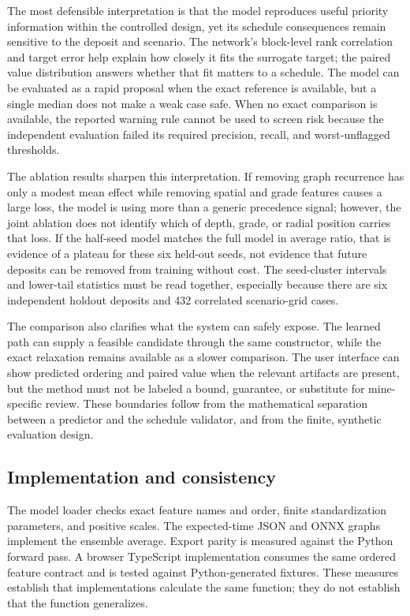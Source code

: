 \documentclass[11pt]{article}
\begin{document}
The most defensible interpretation is that the model reproduces useful priority information within the controlled design, yet its schedule consequences remain sensitive to the deposit and scenario. The network's block-level rank correlation and target error help explain how closely it fits the surrogate target; the paired value distribution answers whether that fit matters to a schedule. The model can be evaluated as a rapid proposal when the exact reference is available, but a single median does not make a weak case safe. When no exact comparison is available, the reported warning rule cannot be used to screen risk because the independent evaluation failed its required precision, recall, and worst-unflagged thresholds.

The ablation results sharpen this interpretation. If removing graph recurrence has only a modest mean effect while removing spatial and grade features causes a large loss, the model is using more than a generic precedence signal; however, the joint ablation does not identify which of depth, grade, or radial position carries that loss. If the half-seed model matches the full model in average ratio, that is evidence of a plateau for these six held-out seeds, not evidence that future deposits can be removed from training without cost. The seed-cluster intervals and lower-tail statistics must be read together, especially because there are six independent holdout deposits and 432 correlated scenario-grid cases.

The comparison also clarifies what the system can safely expose. The learned path can supply a feasible candidate through the same constructor, while the exact relaxation remains available as a slower comparison. The user interface can show predicted ordering and paired value when the relevant artifacts are present, but the method must not be labeled a bound, guarantee, or substitute for mine-specific review. These boundaries follow from the mathematical separation between a predictor and the schedule validator, and from the finite, synthetic evaluation design.

\subsection{Implementation and consistency}
The model loader checks exact feature names and order, finite standardization parameters, and positive scales. The expected-time JSON and ONNX graphs implement the ensemble average. Export parity is measured against the Python forward pass. A browser TypeScript implementation consumes the same ordered feature contract and is tested against Python-generated fixtures. These measures establish that implementations calculate the same function; they do not establish that the function generalizes.
\end{document}
